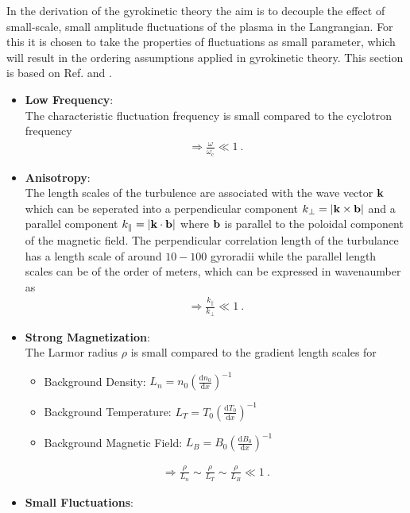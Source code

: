 In the derivation of the gyrokinetic theory the aim is to decouple the effect of small-scale, small amplitude fluctuations of the plasma in the Langrangian. For this it is chosen to take the properties of fluctuations as small parameter, which will result in the ordering assumptions applied in gyrokinetic theory. This section is based on Ref.   and .

\begin{itemize}
	\item \textbf{Low Frequency}:\\
		The characteristic fluctuation frequency is small compared to the cyclotron frequency 
		\begin{gather*}
			\Rightarrow \frac{\omega}{\omega_\mathrm{c}} \ll 1~.
		\end{gather*}
	\item \textbf{Anisotropy}:\\
		The length scales of the turbulence are associated with the wave vector $\boldsymbol{\mathbf{k}}$ which can be seperated into a perpendicular component $k_\perp = |\boldsymbol{\mathbf{k}} \times \boldsymbol{\mathbf{b}}|$ and a parallel component $k_\parallel = |\boldsymbol{\mathbf{k}} \cdot \boldsymbol{\mathbf{b}}|$ where $\boldsymbol{\mathbf{b}}$ is parallel to the poloidal component of the magnetic field. The perpendicular correlation length of the turbulance has a length scale of around $10 - 100$ gyroradii while the parallel length scales can be of the order of meters, which can be expressed in wavenaumber as
		\begin{gather*}
			\Rightarrow \frac{k_\parallel}{k_\perp} \ll 1~.
		\end{gather*}
	\item \textbf{Strong Magnetization}:\\
		The Larmor radius $\rho$ is small compared to the gradient length scales for
		\begin{itemize}
			\item Background Density: $L_n = n_0 \left(\frac{\mathrm{d}n_0}{\mathrm{d}x}\right)^{-1}$
			\item Background Temperature: $L_T = T_0 \left(\frac{\mathrm{d}T_0}{\mathrm{d}x}\right)^{-1}$
			\item Background Magnetic Field: $L_B = B_0 \left(\frac{\mathrm{d}B_0}{\mathrm{d}x}\right)^{-1}$
		\end{itemize}
		\begin{gather*}
			\Rightarrow \frac{\rho}{L_n} \sim \frac{\rho}{L_T} \sim \frac{\rho}{L_B}\ll 1~.
		\end{gather*}
	\item \textbf{Small Fluctuations}:\\

\end{itemize}
